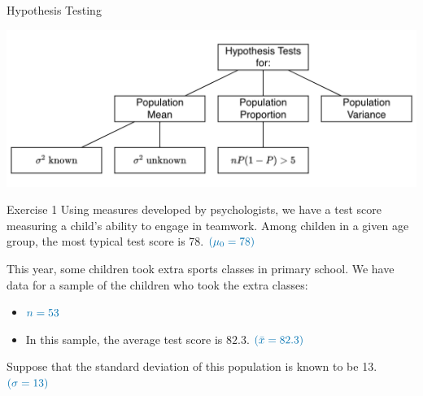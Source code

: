 \documentclass[
  11pt,
  ignorenonframetext,
]{beamer}
\begin{document}
\begin{frame}{Hypothesis Testing}
\protect\hypertarget{hypothesis-testing}{}
\begin{center}\includegraphics[width=0.9\linewidth]{../LAB3-2324/pictures/HypothesisTestObj} \end{center}
\end{frame}

\begin{frame}{Exercise 1}
\protect\hypertarget{exercise-1}{}
Using measures developed by psychologists, we have a test score
measuring a child's ability to engage in teamwork. Among childen in a
given age group, the most typical test score is 78.
\(\color{blue}{(\mu_0 = 78)}\)

This year, some children took extra sports classes in primary school. We
have data for a sample of the children who took the extra classes:

\begin{itemize}
\item
  \(\color{blue}{n=53}\)
\item
  In this sample, the average test score is \(82.3\).
  \(\color{blue}{(\bar{x} = 82.3)}\)
\end{itemize}

Suppose that the standard deviation of this population is known to be
13. \(\color{blue}{(\sigma = 13)}\)
\end{frame}
\end{document}
